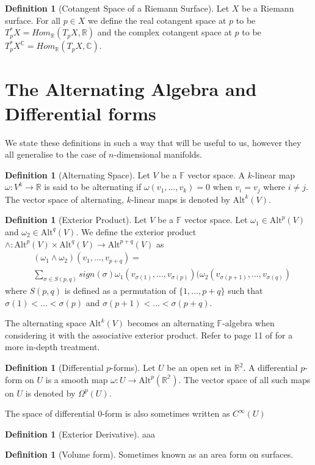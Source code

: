\documentclass[11pt]{report}
\theoremstyle{definition}
\newtheorem{defn}[thm]{Definition}
\begin{document}
\begin{defn}[Cotangent Space of a Riemann Surface]\label{T*pX}
  Let $X$ be a Riemann surface. For all $p \in X$ we define the real
  cotangent space at $p$ to be
  $T^*_pX = Hom_{\mathbb{R}}(T_pX, \mathbb{R})$ and the complex cotangent
  space at $p$ to be
  $T^*_pX^{\mathbb{C}} = Hom_{\mathbb{R}}(T_pX,\mathbb{C})$.
\end{defn}

\section{The Alternating Algebra and Differential forms}
We state these definitions in such a way that will be useful to us, however they all generalise to the case of $n$-dimensional manifolds.
\begin{defn}[Alternating Space]\label{AltSpc}
  Let $V$ be a $\mathbb{F}$ vector space. A $k$-linear map $\omega:V^k\rightarrow \mathbb{R}$ is said to be alternating if $\omega(v_1,\ldots,v_k)=0$ when $v_i=v_j$ where $i\neq j$. The vector space of alternating, $k$-linear maps is denoted by $\text{Alt}^k(V)$.
\end{defn}
\begin{defn}[Exterior Product]
  Let $V$ be a $\mathbb{F}$ vector space. Let $\omega_1 \in \text{Alt}^p(V)$ and $\omega_2 \in \text{Alt}^q(V)$. We define the exterior product $\wedge : \text{Alt}^p(V) \times \text{Alt}^q(V) \rightarrow \text{Alt}^{p+q}(V)$ as 
  \begin{align*}
    &(\omega_1 \wedge \omega_2)(v_1,\ldots,v_{p+q})= \\
    &\sum_{\sigma \in S(p,q)}sign(\sigma)\omega_1(v_{\sigma(1)},\ldots,v_{\sigma(p)})(\omega_2(v_{\sigma(p+1)},\ldots,v_{\sigma(q)})
  \end{align*}
  where $S(p,q)$ is defined as a permutation of $\{1,\ldots,p+q\}$ such that $\sigma(1) < \ldots < \sigma(p)$ and $\sigma(p+1) < \ldots < \sigma(p+q)$.
\end{defn}
The alternating space $\text{Alt}^k(V)$ becomes an alternating $\mathbb{F}$-algebra when considering it with the associative exterior product. Refer to page 11 of \cite{calcohomo} for a more in-depth treatment.

\begin{defn}[Differential $p$-forms]\label{p-form}
  Let $U$ be an open set in $\mathbb{R}^2$. A differential $p$-form on $U$ is a smooth map $\omega : U \rightarrow \text{Alt}^p(\mathbb{R^2})$. The vector space of all such maps on $U$ is denoted by $\Omega^p(U)$.
\end{defn}
  The space of differential $0$-form is also sometimes written as $C^{\infty}(U)$
\begin{defn}[Exterior Derivative]\label{exteriorD}
  aaa
\end{defn}
\begin{defn}[Volume form]\label{volumeform}
  Sometimes known as an area form on surfaces.
\end{defn}
\end{document}
